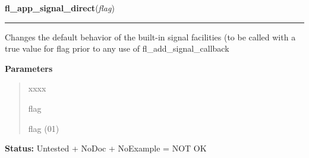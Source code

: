 \hspace{.8\funcindent}\begin{boxedminipage}{\funcwidth}

    \raggedright \textbf{fl\_app\_signal\_direct}(\textit{flag})

    \vspace{-1.5ex}

    \rule{\textwidth}{0.5\fboxrule}
\setlength{\parskip}{2ex}
    Changes the default behavior of the built-in signal facilities (to be 
    called with a true value for flag prior to any use of 
    fl\_add\_signal\_callback

\setlength{\parskip}{1ex}
      \textbf{Parameters}
      \vspace{-1ex}

      \begin{quote}
        \begin{Ventry}{xxxx}

          \item[flag]

          flag (0{\textbar}1)

        \end{Ventry}

      \end{quote}

\textbf{Status:} Untested + NoDoc + NoExample = NOT OK



    \end{boxedminipage}

    \label{xformslib:library:fl_add_timeout}

    \vspace{0.5ex}

